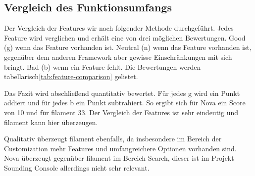 \subsection{Vergleich des Funktionsumfangs}
Der Vergleich der Features wir nach folgender Methode durchgeführt.
Jedes Feature wird verglichen und erhält eine von drei möglichen Bewertungen.
Good (g) wenn das Feature vorhanden ist.
Neutral (n) wenn das Feature vorhanden ist, gegenüber dem anderen Framework aber gewisse Einschränkungen mit sich bringt.
Bad (b) wenn ein Feature fehlt.
Die Bewertungen werden tabellarisch\ref{tab:feature-comparison} gelistet.

Das Fazit wird abschließend quantitativ bewertet.
Für jedes g wird ein Punkt addiert und für jedes b ein Punkt subtrahiert.
So ergibt sich für Nova ein Score von 10 und für filament 33.
Der Vergleich der Features ist sehr eindeutig und filament kann hier überzeugen.

Qualitativ überzeugt filament ebenfalls, da insbesondere im Bereich der Customization mehr Features und umfangreichere Optionen vorhanden sind.
Nova überzeugt gegenüber filament im Bereich Search, dieser ist im Projekt Sounding Console allerdings nicht sehr relevant.


